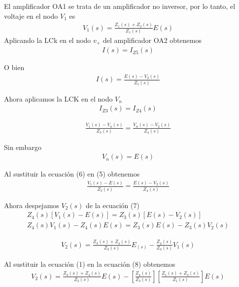 \documentclass[12pt]{article}
\begin{document}
	\noindent El amplificador OA1 se trata de un amplificador no inversor, por lo tanto, el voltaje en el nodo $V_1$ es
	\begin{align}
		V_1(s) = \frac{Z_1(s) + Z_2(s)}{Z_1(s)}E(s)
	\end{align}
	\noindent Aplicando la LCk en el nodo $v_+$ del amplificador OA2 obtenemos
	\begin{align}
		I(s) = I_{Z5}(s)
	\end{align}
	
	\noindent O bien
	\begin{align}
		I(s) = \frac{E(s) - V_2(s)}{Z_5(s)}
	\end{align}
	
	\noindent Ahora aplicamos la LCK en el nodo $V_n$
	\begin{align}
		I_{Z3}(s) = I_{Z4}(s)
	\end{align}
	
	\begin{align}
		\frac{V_1(s) - V_n(s)}{Z_3(s)} = \frac{V_n(s) - V_2(s)}{Z_4(s)}
	\end{align}
	
	\noindent Sin embargo
	\begin{align}
		V_n(s) = E(s)
	\end{align}
	
	\noindent Al sustituir la ecuación (6) en (5) obtenemos
	\begin{align}
		\frac{V_1(s) - E(s)}{Z_3(s)} = \frac{E(s) - V_2(s)}{Z_4(s)}
	\end{align}
	
	\noindent Ahora despejamos $V_2(s)$ de la ecuación (7)
	\begin{align}
		Z_4(s)\left[ V_1(s) - E(s) \right]	= Z_3(s) \left[ E(s) - V_2(s) \right]\nonumber\\
		Z_4(s)V_1(s) - Z_4(s)E(s) = Z_3(s)E(s) - Z_3(s)V_2(s)\nonumber		 
	\end{align}
	
	\begin{align}
		V_2(s) = \frac{Z_3(s) + Z_4(s)}{Z_3(s)}E_(s) - \frac{Z_4(s)}{Z_3(s)}V_1(s)
	\end{align}
	
	\noindent Al sustituir la ecuación (1) en la ecuación (8) obtenemos
	\begin{align}
		V_2(s) = \frac{Z_3(s) + Z_4(s)}{Z_3(s)}E(s) - \left[ \frac{Z_4(s)}{Z_3(s)} \right] \left[ \frac{Z_1(s) + Z_2(s)}{Z_1(s)} \right]E(s) 
	\end{align}
	
\end{document}
